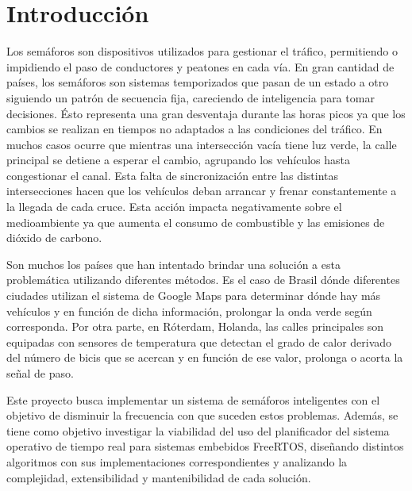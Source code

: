 \section{Introducción}
Los semáforos son dispositivos utilizados para gestionar el tráfico, permitiendo o impidiendo el paso de conductores y peatones en cada vía. En gran cantidad de países, los semáforos son sistemas temporizados
que pasan de un estado a otro siguiendo un patrón de secuencia fija, careciendo de inteligencia para tomar decisiones. Ésto representa una gran desventaja durante las horas picos ya que los cambios se realizan en tiempos no adaptados a las condiciones del tráfico. En muchos casos ocurre que mientras una intersección vacía tiene luz verde, la calle principal se detiene a esperar el cambio, agrupando los vehículos hasta congestionar el canal.
Esta falta de sincronización entre las distintas intersecciones hacen que los vehículos deban arrancar y frenar constantemente a la llegada de cada cruce. Esta acción impacta negativamente sobre el medioambiente ya que aumenta el consumo de combustible y las emisiones de dióxido de carbono.

Son muchos los países que han intentado brindar una solución a esta problemática utilizando diferentes métodos. Es el caso de Brasil dónde diferentes ciudades utilizan el sistema de Google Maps para determinar dónde hay más vehículos y en función de dicha información, prolongar la onda verde según corresponda.
Por otra parte, en Róterdam, Holanda, las calles principales son equipadas con sensores de temperatura que detectan el grado de calor derivado del número de bicis que se acercan y en función de ese valor, prolonga o acorta la señal de paso.

Este proyecto busca implementar un sistema de semáforos inteligentes con el objetivo de disminuir la frecuencia con que suceden estos problemas. Además, se tiene como objetivo investigar la viabilidad del uso del planificador del sistema operativo de tiempo real para sistemas embebidos FreeRTOS, diseñando distintos algoritmos con sus implementaciones correspondientes y analizando la complejidad, extensibilidad y mantenibilidad de cada solución.
